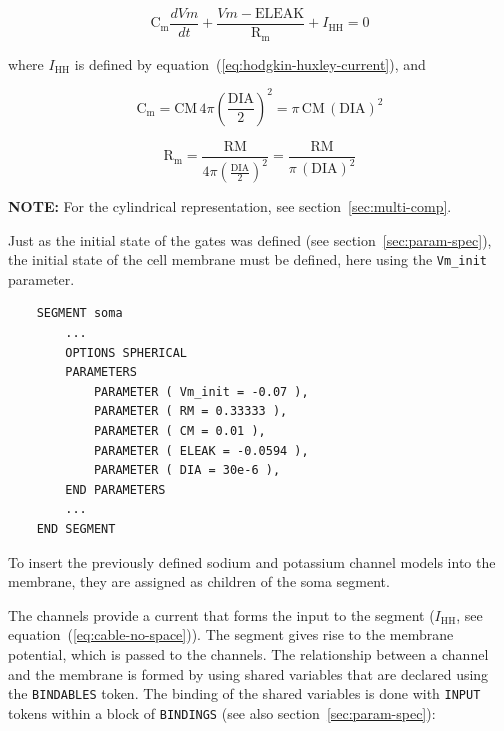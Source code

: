 \documentclass[12pt]{article}
\begin{document}
\begin{equation}
  \label{eq:cable-no-space}
  \mathrm{C_m} \frac{dVm}{dt} + \frac{Vm - \mathrm{ELEAK}}{\mathrm{R_m}} + I_{\mathrm{HH}} = 0
\end{equation}

where $I_{\mathrm{HH}}$ is defined by
equation~(\ref{eq:hodgkin-huxley-current}), and

\begin{equation}
  \label{eq:cable-no-space-cm}
  \mathrm{C_m} = \mathrm{CM} \, 4 \pi \left( \frac{\mathrm{DIA}}{2} \right) ^2 = \pi \, \mathrm{CM} \, (\mathrm{DIA}) ^2
\end{equation}

\begin{equation}
  \label{eq:cable-no-space-rm}
  \mathrm{R_m} = \frac{\mathrm{RM}}{4 \pi \left( \frac{\mathrm{DIA}}{2} \right) ^2} = \frac{\mathrm{RM}}{\pi \, (\mathrm{DIA}) ^2}
\end{equation}

{\bf NOTE:} For the cylindrical representation, see section~\ref{sec:multi-comp}.

Just as the initial state of the gates was defined (see
section~\ref{sec:param-spec}), the initial state of the cell membrane
must be defined, here using the {\tt Vm\_init} parameter.

\begin{verbatim}
    SEGMENT soma
        ...
        OPTIONS SPHERICAL
        PARAMETERS
            PARAMETER ( Vm_init = -0.07 ),
            PARAMETER ( RM = 0.33333 ),
            PARAMETER ( CM = 0.01 ),
            PARAMETER ( ELEAK = -0.0594 ),
            PARAMETER ( DIA = 30e-6 ),
        END PARAMETERS
        ...
    END SEGMENT
\end{verbatim}

To insert the previously defined sodium and potassium channel models
into the membrane, they are assigned as children of the soma segment.

The channels provide a current that forms the input to the segment
($I_\mathrm{HH}$, see equation~(\ref{eq:cable-no-space})).  The segment
gives rise to the membrane potential, which is passed to the channels.
The relationship between a channel and the membrane is formed by using
shared variables that are declared using the {\tt BINDABLES} token.
The binding of the shared variables is done with {\tt INPUT} tokens
within a block of {\tt BINDINGS} (see also
section~\ref{sec:param-spec}):
\end{document}
